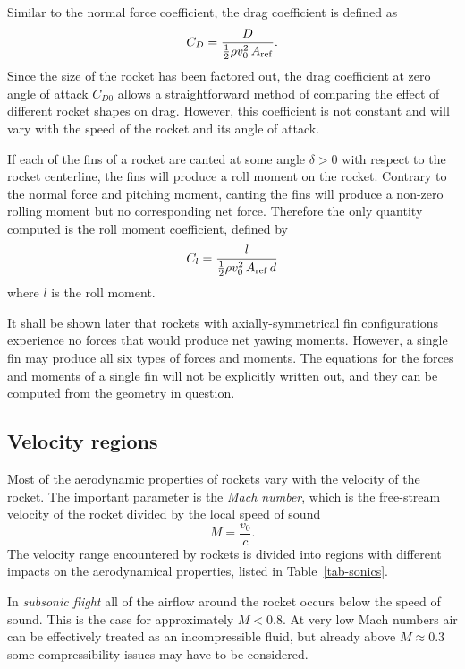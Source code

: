 Similar to the normal force coefficient, the drag coefficient is
defined as
%
\begin{equation}
C_D = \frac{D}{\frac{1}{2}\rho v_0^2 \, A_{\rm ref}}.
\label{eq-CD-def}
\end{equation}
%
Since the size of the rocket has been factored out, the drag
coefficient at zero angle of attack $C_{D0}$ allows a straightforward
method of comparing the effect of different rocket shapes on drag.
However, this coefficient is not constant and will vary with \eg the
speed of the rocket and its angle of attack.


If each of the fins of a rocket are canted at some angle $\delta>0$
with respect to the rocket centerline, the fins will produce a roll
moment on the rocket.  Contrary to the normal force and pitching
moment, canting the fins will produce a non-zero rolling moment but no
corresponding net force.  Therefore the only quantity computed is the
roll moment coefficient, defined by
%
\begin{equation}
C_l  =  \frac{l}{\frac{1}{2}\rho v_0^2 \, A_{\rm ref}\, d}
\label{eq-Cl-def}
\end{equation}
%
where $l$ is the roll moment.

It shall be shown later that rockets with axially-symmetrical fin
configurations experience no forces that would produce net yawing
moments. However, a single fin may produce all six types of forces and
moments. The equations for the forces and moments of a single fin will
not be explicitly written out, and they can be computed from the
geometry in question.



\subsection{Velocity regions}

Most of the aerodynamic properties of rockets vary with the velocity
of the rocket.  The important parameter is the {\it Mach number},
which is the free-stream velocity of the rocket divided by the local
speed of sound
%
\begin{equation}
M = \frac{v_0}{c}.
\end{equation}
%
The velocity range encountered by rockets is divided into regions with
different impacts on the aerodynamical properties, listed in
Table~\ref{tab-sonics}.  

In {\it subsonic flight} all of the airflow around the rocket occurs
below the speed of sound.  This is the case for approximately $M<0.8$.
At very low Mach numbers air can be effectively treated as an
incompressible fluid, but already above $M\approx 0.3$ some
compressibility issues may have to be considered.

